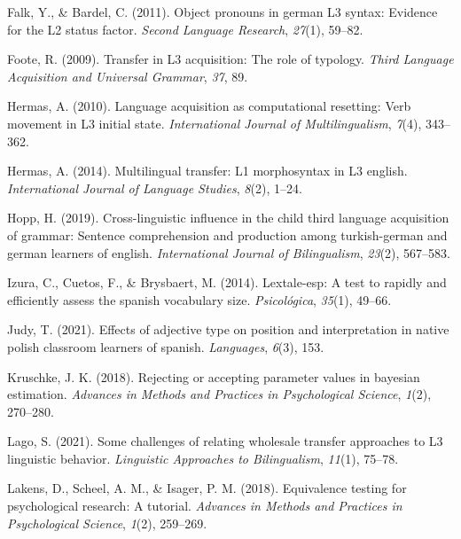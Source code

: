 \documentclass[
  man,floatsintext]{apa6}
\newlength{\cslhangindent}
\newlength{\cslentryspacingunit} %
\newenvironment{CSLReferences}[2] %
 {%
  \setlength{\parindent}{0pt}
  \ifodd #1
  \let\oldpar\par
  \def\par{\hangindent=\cslhangindent\oldpar}
  \fi
  \setlength{\parskip}{#2\cslentryspacingunit}
 }%
 {}
\begin{document}
\begin{CSLReferences}{1}{0}
\leavevmode{}%
Falk, Y., \& Bardel, C. (2011). Object pronouns in german L3 syntax: Evidence for the L2 status factor. \emph{Second Language Research}, \emph{27}(1), 59--82.

\leavevmode{}%
Foote, R. (2009). Transfer in L3 acquisition: The role of typology. \emph{Third Language Acquisition and Universal Grammar}, \emph{37}, 89.

\leavevmode{}%
Hermas, A. (2010). Language acquisition as computational resetting: Verb movement in L3 initial state. \emph{International Journal of Multilingualism}, \emph{7}(4), 343--362.

\leavevmode{}%
Hermas, A. (2014). Multilingual transfer: L1 morphosyntax in L3 english. \emph{International Journal of Language Studies}, \emph{8}(2), 1--24.

\leavevmode{}%
Hopp, H. (2019). Cross-linguistic influence in the child third language acquisition of grammar: Sentence comprehension and production among turkish-german and german learners of english. \emph{International Journal of Bilingualism}, \emph{23}(2), 567--583.

\leavevmode{}%
Izura, C., Cuetos, F., \& Brysbaert, M. (2014). Lextale-esp: A test to rapidly and efficiently assess the spanish vocabulary size. \emph{Psicol{ó}gica}, \emph{35}(1), 49--66.

\leavevmode{}%
Judy, T. (2021). Effects of adjective type on position and interpretation in native polish classroom learners of spanish. \emph{Languages}, \emph{6}(3), 153.

\leavevmode{}%
Kruschke, J. K. (2018). Rejecting or accepting parameter values in bayesian estimation. \emph{Advances in Methods and Practices in Psychological Science}, \emph{1}(2), 270--280.

\leavevmode{}%
Lago, S. (2021). Some challenges of relating wholesale transfer approaches to L3 linguistic behavior. \emph{Linguistic Approaches to Bilingualism}, \emph{11}(1), 75--78.

\leavevmode{}%
Lakens, D., Scheel, A. M., \& Isager, P. M. (2018). Equivalence testing for psychological research: A tutorial. \emph{Advances in Methods and Practices in Psychological Science}, \emph{1}(2), 259--269.


\end{CSLReferences}
\end{document}
